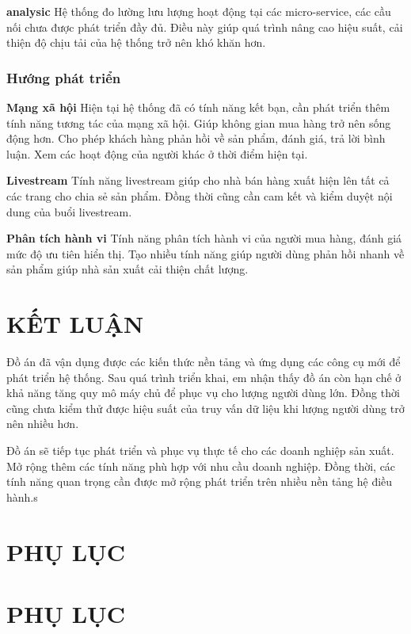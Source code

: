\documentclass[11pt]{report}
\begin{document}
	\textbf{analysic} Hệ thống đo lường lưu lượng hoạt động tại các micro-service, các cầu nối chưa được phát triển đầy đủ. Điều này giúp quá trình nâng cao hiệu suất, cải thiện độ chịu tải của hệ thống trở nên khó khăn hơn.
	
	\subsection{Hướng phát triển}
	
	\textbf{Mạng xã hội} Hiện tại hệ thống đã có tính năng kết bạn, cần phát triển thêm tính năng tương tác của mạng xã hội. Giúp không gian mua hàng trở nên sống động hơn. Cho phép khách hàng phản hồi về sản phẩm, đánh giá, trả lời bình luận. Xem các hoạt động của người khác ở thời điểm hiện tại.
	
	\textbf{Livestream} Tính năng livestream giúp cho nhà bán hàng xuất hiện lên tất cả các trang cho chia sẻ sản phẩm. Đồng thời cũng cần cam kết và kiểm duyệt nội dung của buổi livestream.
	
	\textbf{Phân tích hành vi} Tính năng phân tích hành vi của người mua hàng, đánh giá mức độ ưu tiên hiển thị. Tạo nhiều tính năng giúp người dùng phản hồi nhanh về sản phẩm giúp nhà sản xuất cải thiện chất lượng.
	
	\chapter*{KẾT LUẬN}
	Đồ án đã vận dụng được các kiến thức nền tảng và ứng dụng các công cụ mới để phát triển hệ thống. Sau quá trình triển khai, em nhận thấy đồ án còn hạn chế ở khả năng tăng quy mô máy chủ để phục vụ cho lượng người dùng lớn. Đồng thời cũng chưa kiểm thử được hiệu suất của truy vấn dữ liệu khi lượng người dùng trở nên nhiều hơn.
	
	Đồ án sẽ tiếp tục phát triển và phục vụ thực tế cho các doanh nghiệp sản xuất. Mở rộng thêm các tính năng phù hợp với nhu cầu doanh nghiệp. Đồng thời, các tính năng quan trọng cần được mở rộng phát triển trên nhiều nền tảng hệ điều hành.s
	
	
	
	
	\chapter*{PHỤ LỤC}
	
	\chapter*{PHỤ LỤC}
	
\end{document}

